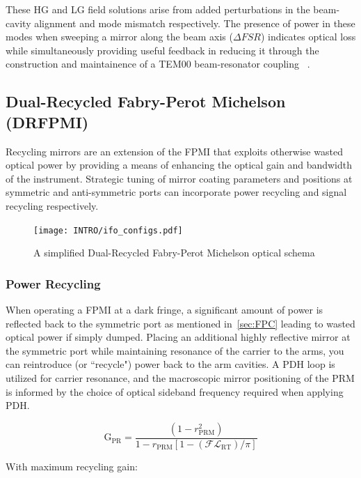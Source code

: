 \newpage 
These HG and LG field solutions arise from added perturbations in the beam-cavity alignment and mode mismatch respectively. The presence of power in these modes when sweeping a mirror along the beam axis ($\Delta FSR$) indicates optical loss while simultaneously providing useful feedback in reducing it through the construction and maintainence of a TEM00 beam-resonator coupling ~\cite{anderson:1984}. 

\subsection{Dual-Recycled Fabry-Perot Michelson (DRFPMI)}
Recycling mirrors are an extension of the FPMI that exploits otherwise wasted optical power by providing a means of enhancing the optical gain and bandwidth of the instrument. Strategic tuning of mirror coating parameters and positions at symmetric and anti-symmetric ports can incorporate power recycling and signal recycling respectively.

\begin{figure}[ht!]
\begin{center}
\texttt{[image: INTRO/ifo\_configs.pdf]}
\end{center}
\caption{A simplified Dual-Recycled Fabry-Perot Michelson optical schema}
\label{fig:drfp_michelson}
\end{figure}

\subsubsection{Power Recycling}
When operating a FPMI at a dark fringe, a significant amount of power is reflected back to the symmetric port as mentioned in~\autoref{sec:FPC} leading to wasted optical power if simply dumped. Placing an additional highly reflective mirror at the symmetric port while maintaining resonance of the carrier to the arms, you can reintroduce (or ``recycle") power back to the arm cavities. A PDH loop is utilized for carrier resonance, and the macroscopic mirror positioning of the PRM is informed by the choice of optical sideband frequency required when applying PDH. 

\begin{equation}
	\mathrm{G_{PR}} = \frac{(1-r_\mathrm{PRM}^2)}{1-r_\mathrm{PRM}[1- (\mathscr{F} \mathscr{L}_\mathrm{RT})/ \pi]}
\end{equation}

\noindent With maximum recycling gain: 

